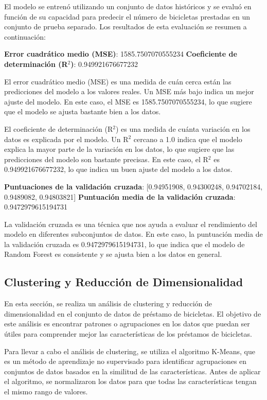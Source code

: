 \documentclass{wsdcr}
\begin{document}
El modelo se entrenó utilizando un conjunto de datos históricos y se evaluó en función de su capacidad para predecir el número de bicicletas prestadas en un conjunto de prueba separado. Los resultados de esta evaluación se resumen a continuación:

\textbf{Error cuadrático medio (MSE)}: 1585.7507070555234
\textbf{Coeficiente de determinación (R$^2$)}: 0.949921676677232

El error cuadrático medio (MSE) es una medida de cuán cerca están las predicciones del modelo a los valores reales. Un MSE más bajo indica un mejor ajuste del modelo. En este caso, el MSE es 1585.7507070555234, lo que sugiere que el modelo se ajusta bastante bien a los datos.

El coeficiente de determinación (R$^2$) es una medida de cuánta variación en los datos es explicada por el modelo. Un R$^2$ cercano a 1.0 indica que el modelo explica la mayor parte de la variación en los datos, lo que sugiere que las predicciones del modelo son bastante precisas. En este caso, el R$^2$ es 0.949921676677232, lo que indica un buen ajuste del modelo a los datos.

\textbf{Puntuaciones de la validación cruzada}: [0.94951908, 0.94300248, 0.94702184, 0.9489082, 0.94803821]
\textbf{Puntuación media de la validación cruzada}: 0.9472979615194731

La validación cruzada es una técnica que nos ayuda a evaluar el rendimiento del modelo en diferentes subconjuntos de datos. En este caso, la puntuación media de la validación cruzada es 0.9472979615194731, lo que indica que el modelo de Random Forest es consistente y se ajusta bien a los datos en general.

\subsection{Clustering y Reducción de Dimensionalidad}

En esta sección, se realiza un análisis de clustering y reducción de dimensionalidad en el conjunto de datos de préstamo de bicicletas. El objetivo de este análisis es encontrar patrones o agrupaciones en los datos que puedan ser útiles para comprender mejor las características de los préstamos de bicicletas.

Para llevar a cabo el análisis de clustering, se utiliza el algoritmo K-Means, que es un método de aprendizaje no supervisado para identificar agrupaciones en conjuntos de datos basados en la similitud de las características. Antes de aplicar el algoritmo, se normalizaron los datos para que todas las características tengan el mismo rango de valores.
\end{document}
